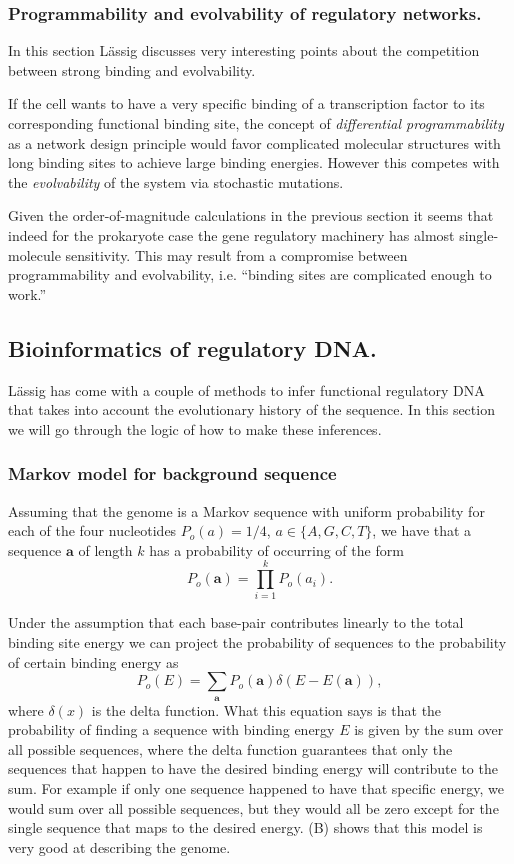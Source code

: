 \subsubsection{Programmability and evolvability of regulatory networks.}
In this section L\"{a}ssig discusses very interesting points about the competition
between strong binding and evolvability.

If the cell wants to have a very specific binding of a transcription factor to
its corresponding functional binding site, the concept of {\it differential
programmability} as a network design principle would favor complicated
molecular structures with long binding sites to achieve large binding energies.
However this competes with the {\it evolvability} of the system via stochastic
mutations.

Given the order-of-magnitude calculations in the previous section it seems that
indeed for the prokaryote case the gene regulatory machinery has almost single-
molecule sensitivity. This may result from a compromise between programmability
and evolvability, i.e. ``binding sites are complicated enough to work.''

\subsection{Bioinformatics of regulatory DNA.}
L\"{a}ssig has come with a couple of methods to infer functional regulatory DNA that
takes into account the evolutionary history of the sequence. In this section we
will go through the logic of how to make these inferences.

\subsubsection{Markov model for background sequence}

Assuming that the genome is a Markov sequence with uniform probability for each
of the four nucleotides $P_o(a) = 1/4$, $a \in \{A, G, C, T \}$, we have that a
sequence $\mathbf{a}$ of length $k$ has a probability of occurring of the form
\begin{equation}
  P_o(\mathbf{a}) = \prod_{i=1}^k P_o(a_i).
\end{equation}

Under the assumption that each base-pair contributes linearly to the total
binding site energy we can project the probability of sequences to the
probability of certain binding energy as
\begin{equation}
  P_o(E) = \sum_{\mathbf{a}} P_o(\mathbf{a}) \delta(E - E(\mathbf{a})),
\end{equation}
where $\delta(x)$ is the delta function. What this equation says is that the
probability of finding a sequence with binding energy $E$ is given by the sum
over all possible sequences, where the delta function guarantees that only the
sequences that happen to have the desired binding energy will contribute to the
sum. For example if only one sequence happened to have that specific energy, we
would sum over all possible sequences, but they would all be zero except for the
single sequence that maps to the desired energy. (B)
shows that this model is very good at describing the genome.

